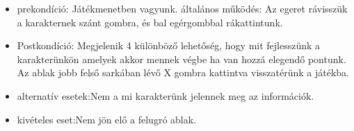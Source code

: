
\begin{itemize}
    \item prekondíció: Játékmenetben vagyunk.
    általános működés: Az egeret rávisszük a karakternek szánt gombra, és bal egérgombbal rákattintunk.
    \item Postkondíció: Megjelenik 4 különböző lehetőség, hogy mit fejlesszünk a karakterünkön amelyek akkor mennek végbe ha van hozzá elegendő pontunk. Az ablak jobb felső sarkában lévő X gombra kattintva visszatérünk a játékba.
    \item alternatív esetek:Nem a mi karakterünk jelennek meg az információk.
    \item kivételes eset:Nem jön elő a felugró ablak.
\end{itemize}

